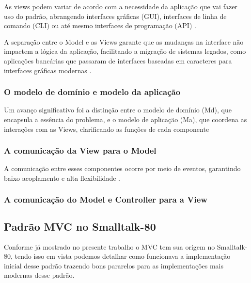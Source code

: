             \par As views podem variar de acordo com a necessidade da aplicação que vai fazer uso do padrão, abrangendo interfaces gráficas (GUI), interfaces de linha de comando (CLI) ou até mesmo interfaces de programação (API) \cite{artigo:deacon:2009}.

            \par A separação entre o Model e as Views garante que as mudanças na interface não impactem a lógica da aplicação, facilitando a migração de sistemas legados, como aplicações bancárias que passaram de interfaces baseadas em caracteres para interfaces gráficas modernas \cite{artigo:deacon:2009}.
        
        \subsubsection{O modelo de domínio e modelo da aplicação}
            \par Um avanço significativo foi a distinção entre o modelo de domínio (Md), que encapsula a essência do problema, e o modelo de aplicação (Ma), que coordena as interações com as Views, clarificando as funções de cada componente \cite{artigo:deacon:2009}

        \subsubsection{A comunicação da View para o Model}
            \par A comunicação entre esses componentes ocorre por meio de eventos, garantindo baixo acoplamento e alta flexibilidade \cite{artigo:deacon:2009}. 
            
        \subsubsection{A comunicação do Model e Controller para a View}

    
        \subsection{Padrão MVC no Smalltalk-80}

            \par Conforme já mostrado no presente trabalho o MVC tem sua origem no Smalltalk-80, tendo isso em vista podemos detalhar como funcionava a implementação inicial desse padrão trazendo bons pararelos para as implementações mais modernas desse padrão.
        
